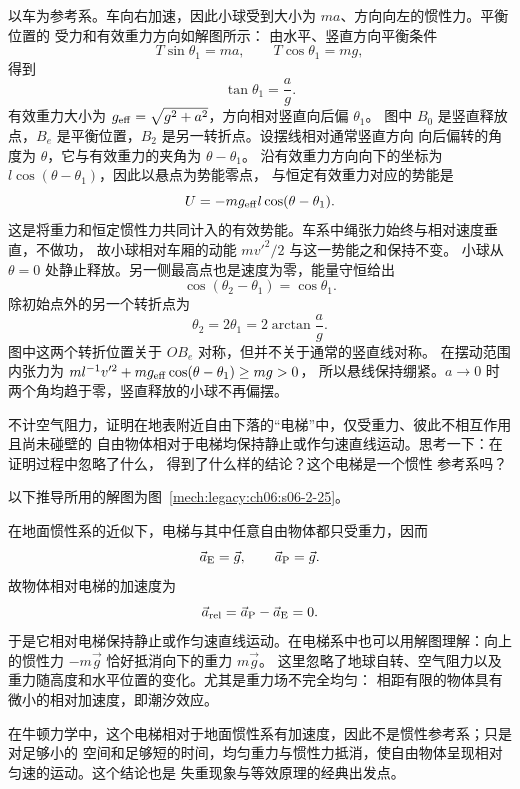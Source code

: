 {\begin{xesolution}
以车为参考系。车向右加速，因此小球受到大小为 $ma$、方向向左的惯性力。平衡位置的
受力和有效重力方向如解图所示：
\soldiagTwoTwentyFour
由水平、竖直方向平衡条件
\[
 T\sin\theta_1=ma,
 \qquad
 T\cos\theta_1=mg,
\]
得到
\[
 \boxed{\tan\theta_1=\frac ag}.
\]
有效重力大小为 $g_{\rm eff}=\sqrt{g^2+a^2}$，方向相对竖直向后偏 $\theta_1$。
图中 $B_0$ 是竖直释放点，$B_e$ 是平衡位置，$B_2$ 是另一转折点。设摆线相对通常竖直方向
向后偏转的角度为 $\theta$，它与有效重力的夹角为 $\theta-\theta_1$。
沿有效重力方向向下的坐标为 $l\cos(\theta-\theta_1)$，因此以悬点为势能零点，
与恒定有效重力对应的势能是
\[
 U=-mg_{\rm eff}l\cos(\theta-\theta_1).
\]
这是将重力和恒定惯性力共同计入的有效势能。车系中绳张力始终与相对速度垂直，不做功，
故小球相对车厢的动能 $mv'^2/2$ 与这一势能之和保持不变。
小球从 $\theta=0$ 处静止释放。另一侧最高点也是速度为零，能量守恒给出
\[
 \cos(\theta_2-\theta_1)=\cos\theta_1.
\]
除初始点外的另一个转折点为
\[
 \boxed{\theta_2=2\theta_1
 =2\arctan\frac ag}.
\]
图中这两个转折位置关于 $OB_e$ 对称，但并不关于通常的竖直线对称。
在摆动范围内张力为 $ml^{-1}v'^2+mg_{\rm eff}\cos(\theta-\theta_1)\ge mg>0$，
所以悬线保持绷紧。$a\to0$ 时两个角均趋于零，竖直释放的小球不再偏摆。
\end{xesolution}

\begin{origexamplebox}{}\label{ch06:ex:s06-2-25}
不计空气阻力，证明在地表附近自由下落的“电梯”中，仅受重力、彼此不相互作用且尚未碰壁的
自由物体相对于电梯均保持静止或作匀速直线运动。思考一下：在证明过程中忽略了什么，
得到了什么样的结论？这个电梯是一个惯性
参考系吗？
\probdiagTwoTwentyFive
\end{origexamplebox}

\begin{xesolution}
以下推导所用的解图为图~\ref{mech:legacy:ch06:s06-2-25}。

在地面惯性系的近似下，电梯与其中任意自由物体都只受重力，因而
\[
 \vec a_{\rm E}=\vec g,
 \qquad
 \vec a_{\rm P}=\vec g.
\]
故物体相对电梯的加速度为
\[
 \vec a_{\rm rel}=\vec a_{\rm P}-\vec a_{\rm E}=0.
\]
于是它相对电梯保持静止或作匀速直线运动。在电梯系中也可以用解图理解：向上的惯性力
$-m\vec g$ 恰好抵消向下的重力 $m\vec g$。
\soldiagTwoTwentyFive
这里忽略了地球自转、空气阻力以及重力随高度和水平位置的变化。尤其是重力场不完全均匀：
相距有限的物体具有微小的相对加速度，即潮汐效应。

在牛顿力学中，这个电梯相对于地面惯性系有加速度，因此不是惯性参考系；只是对足够小的
空间和足够短的时间，均匀重力与惯性力抵消，使自由物体呈现相对匀速的运动。这个结论也是
失重现象与等效原理的经典出发点。
\end{xesolution}

}
